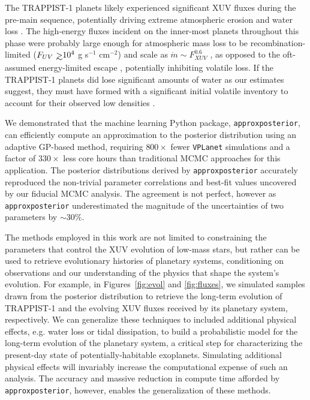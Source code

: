 \documentclass[twocolumn]{aastex62}
\def\gsim{~\rlap{$>$}{\lower 1.0ex\hbox{$\sim$}}}
\newcommand{\vplanet}[0]{\texttt{VPLanet}\xspace}
\newcommand{\approxposterior}[0]{\texttt{approxposterior}\xspace}
\begin{document}
The TRAPPIST-1 planets likely experienced significant XUV fluxes during the pre-main sequence, potentially driving extreme atmospheric erosion and water loss \citep{Bolmont2017,Bourrier2017a}. The high-energy fluxes incident on the inner-most planets throughout this phase were probably large enough for atmospheric mass loss to be recombination-limited ($F_{UV} \gsim 10^4$ g s$^{-1}$ cm$^{-2}$) and scale as $\dot{m} \sim F_{XUV}^{0.6}$ \citep{MurrayClay2009}, as opposed to the oft-assumed energy-limited escape \citep[$\dot{m} \sim F_{XUV}$,][]{Watson1981,Lammer2003}, potentially inhibiting volatile loss. If the TRAPPIST-1 planets did lose significant amounts of water as our estimates suggest, they must have formed with a significant initial volatile inventory to account for their observed low densities \citep{Grimm2018}.

We demonstrated that the machine learning Python package, \approxposterior \citep{FlemingVanderPlas2018}, can efficiently compute an approximation to the posterior distribution using an adaptive GP-based method, requiring $800\times$ fewer \vplanet simulations and a factor of $330\times$ less core hours than traditional MCMC approaches for this application. The posterior distributions derived by \approxposterior accurately reproduced the non-trivial parameter correlations and best-fit values uncovered by our fiducial MCMC analysis. The agreement is not perfect, however as \approxposterior underestimated the magnitude of the uncertainties of two parameters by ${\sim}30\%$.  

The methods employed in this work are not limited to constraining the parameters that control the XUV evolution of low-mass stars, but rather can be used to retrieve evolutionary histories of planetary systems, conditioning on observations and our understanding of the physics that shape the system's evolution. For example, in Figures~\ref{fig:evol} and \ref{fig:fluxes}, we simulated samples drawn from the posterior distribution to retrieve the long-term evolution of TRAPPIST-1 and the evolving XUV fluxes received by its planetary system, respectively. We can generalize these techniques to included additional physical effects, e.g. water loss or tidal dissipation, to build a probabilistic model for the long-term evolution of the planetary system, a critical step for characterizing the present-day state of potentially-habitable exoplanets. Simulating additional physical effects will invariably increase the computational expense of such an analysis. The accuracy and massive reduction in compute time afforded by \approxposterior, however, enables the generalization of these methods. 
\end{document}
